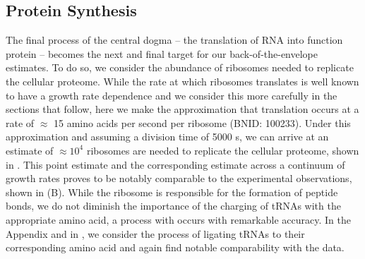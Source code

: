 \subsection{Protein Synthesis}
The final process of the central dogma -- the translation of RNA into function
protein -- becomes the next and final target for our back-of-the-envelope
estimates. To do so, we consider the abundance of ribosomes needed to replicate
the cellular proteome.  While the rate at which ribosomes
translates is well known to have a growth rate dependence \cite{dai2018} and
we consider this more carefully in the sections that follow, here we make the
approximation that translation occurs at a rate of $\approx$ 15 amino acids
per second per ribosome (BNID: 100233). Under this approximation and assuming
a division time of 5000 s, we can arrive at an estimate of $\approx 10^4$
ribosomes are needed to replicate the cellular proteome, shown in
. This point estimate and the corresponding estimate
across a continuum of growth rates proves to be notably comparable
to the experimental observations, shown in (B).
While the ribosome is responsible for the formation of peptide bonds, we do not
diminish the importance of the charging of tRNAs with the appropriate amino
acid, a process with occurs with remarkable accuracy. In the Appendix and in , we consider
the process of ligating tRNAs to their corresponding amino acid and again find
notable comparability with the data.





